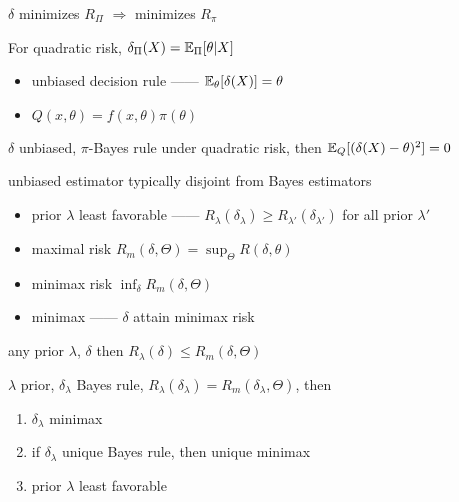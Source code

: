 \begin{prop}
    $\delta$ minimizes $R_\Pi$ $\Rightarrow$ minimizes $R_\pi$
\end{prop}

\begin{fact}
    For quadratic risk, $\delta_\Pi(X) = \mathbb{E}_{\Pi}[\theta|X]$
\end{fact}

\begin{itemize}
    \item unbiased decision rule ------ $\mathbb{E}_\theta[\delta(X)] = \theta$
    \item $Q(x, \theta) = f(x, \theta)\pi(\theta)$
\end{itemize}

\begin{prop}
    $\delta$ unbiased, $\pi$-Bayes rule under quadratic risk, then $\mathbb{E}_Q[(\delta(X) - \theta)^2] = 0$
\end{prop}

\begin{fact}
    unbiased estimator typically disjoint from Bayes estimators
\end{fact}

\begin{itemize}
    \item prior $\lambda$ least favorable ------ $R_\lambda(\delta_\lambda) \geq R_{\lambda'}(\delta_{\lambda'})$ for all prior $\lambda'$
    \item maximal risk $R_m(\delta, \Theta) = \sup_\Theta R(\delta, \theta)$
    \item minimax risk $\inf_\delta R_m(\delta, \Theta)$
    \item minimax ------ $\delta$ attain minimax risk
\end{itemize}

\begin{prop}
    any prior $\lambda$, $\delta$ then $R_\lambda(\delta) \leq R_m(\delta, \Theta)$
\end{prop}

\begin{prop}
    $\lambda$ prior, $\delta_\lambda$ Bayes rule, $R_\lambda(\delta_\lambda) = R_m(\delta_\lambda, \Theta)$, then
    \begin{enumerate}
        \item $\delta_\lambda$ minimax
        \item if $\delta_\lambda$ unique Bayes rule, then unique minimax
        \item prior $\lambda$ least favorable
    \end{enumerate}
\end{prop}

